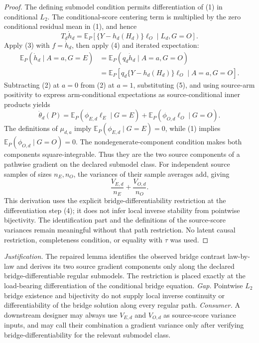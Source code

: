 \documentclass{article}
\begin{document}
\begin{proof}
The defining submodel condition permits differentiation of (1) in conditional \(L_2\).  The conditional-score centering term is multiplied by the zero conditional residual mean in (1), and hence
\[
 T_d\dot h_d
 ={\mathbb E}_P[\{Y-h_d(H_d)\}\ell_O\mid L_d,G=O]. \tag{4}
\]
Apply (3) with \(f=\dot h_d\), then apply (4) and iterated expectation:
\[
\begin{aligned}
 {\mathbb E}_P(\dot h_d\mid A=a,G=E)
 &={\mathbb E}_P(q_d\dot h_d\mid A=a,G=O)\\
 &={\mathbb E}_P[q_d\{Y-h_d(H_d)\}\ell_O\mid A=a,G=O]. \tag{5}
\end{aligned}
\]
Subtracting (2) at \(a=0\) from (2) at \(a=1\), substituting (5), and using source-arm positivity to express arm-conditional expectations as source-conditional inner products yields
\[
 \dot\theta_d(P)
 ={\mathbb E}_P(\phi_{E,d}\ell_E\mid G=E)
  +{\mathbb E}_P(\phi_{O,d}\ell_O\mid G=O). \tag{6}
\]
The definitions of \(\mu_{d,a}\) imply \({\mathbb E}_P(\phi_{E,d}\mid G=E)=0\), while (1) implies \({\mathbb E}_P(\phi_{O,d}\mid G=O)=0\).  The nondegenerate-component condition makes both components square-integrable.  Thus they are the two source components of a pathwise gradient on the declared submodel class.  For independent source samples of sizes \(n_E,n_O\), the variances of their sample averages add, giving
\[
 \frac{V_{E,d}}{n_E}+\frac{V_{O,d}}{n_O}. \tag{7}
\]
This derivation uses the explicit bridge-differentiability restriction at the differentiation step (4); it does not infer local inverse stability from pointwise bijectivity.  The identification part and the definitions of the source-score variances remain meaningful without that path restriction.  No latent causal restriction, completeness condition, or equality with \(\tau\) was used.
\end{proof}
\par\smallskip\noindent \textit{Justification.} The repaired lemma identifies the observed bridge contrast law-by-law and derives its two source gradient components only along the declared bridge-differentiable regular submodels.  The restriction is placed exactly at the load-bearing differentiation of the conditional bridge equation. \textit{Gap.} Pointwise \(L_2\) bridge existence and bijectivity do not supply local inverse continuity or differentiability of the bridge solution along every regular path. \textit{Consumer.} A downstream designer may always use \(V_{E,d}\) and \(V_{O,d}\) as source-score variance inputs, and may call their combination a gradient variance only after verifying bridge-differentiability for the relevant submodel class.
\end{document}
